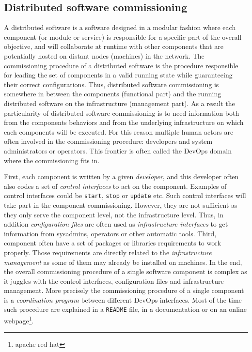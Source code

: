 
\subsection{Distributed software commissioning}

A distributed software is a software designed in a modular fashion
where each component (or module or service) is responsible for a
specific part of the overall objective, and will collaborate at
runtime with other components that are potentially hosted on distant
nodes (\ie machines) in the network.
%
The commissioning procedure of a distributed software is the procedure
responsible for leading the set of components in a valid running state
while guaranteeing their correct configurations. Thus, distributed
software commissioning is somewhere in between the components
(functional part) and the running distributed software on the
infrastructure (management part). As a result the particularity of
distributed software commissioning is to need information both from
the components behaviors and from the underlying infrastructure on
which each components will be executed.
For this reason multiple human actors are often involved in the
commissioning procedure: developers and system administrators or
operators. This frontier is often called the DevOps domain where the
commissioning fits in.

First, each component is written by a given \emph{developer}, and this
developer often also codes a set of \emph{control interfaces} to act
on the component. Examples of control interfaces could be
\texttt{start}, \texttt{stop} or \texttt{update} etc. Such control
interfaces will take part in the component commissioning. However,
they are not sufficient as they only serve the component level, not
the infrastructure level. Thus, in addition \emph{configuration files}
are often used as \emph{infrastructure interfaces} to get information
from sysadmins, operators or other automatic tools. Third, component
often have a set of packages or libraries requirements to work
properly. Those requirements are directly related to the
\emph{infrastructure management} as some of them may already be
installed on machines. In the end, the overall commissioning procedure
of a single software component is complex as it juggles with the
control interfaces, configuration files and infrastructure
management. More precisely the commissioning procedure of a single
component is a \emph{coordination program} between different DevOps
interfaces. Most of the time such procedure are explained in a
\texttt{README} file, in a documentation or on an online
webpage\footnote{apache red hat}.

